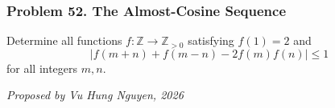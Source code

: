 \subsubsection*{Problem 52. The Almost-Cosine Sequence}

\begin{exercisebox}[hard]

Determine all functions $f:\mathbb Z\to\mathbb Z_{>0}$ satisfying $f(1)=2$ and
\[
\boxed{\qquad
\left|f(m+n)+f(m-n)-2f(m)f(n)\right|\le1
\qquad}
\]
for all integers $m,n$.

\begin{flushright}
\textit{Proposed by Vu Hung Nguyen, 2026}
\end{flushright}


\end{exercisebox}
